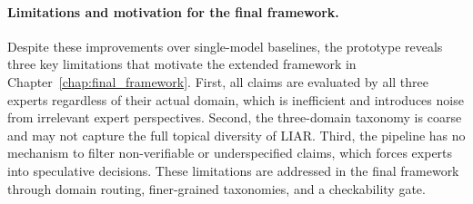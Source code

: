 \paragraph{Limitations and motivation for the final framework.}
Despite these improvements over single-model baselines, the prototype reveals three key limitations that motivate the extended framework in Chapter~\ref{chap:final_framework}. First, all claims are evaluated by all three experts regardless of their actual domain, which is inefficient and introduces noise from irrelevant expert perspectives. Second, the three-domain taxonomy is coarse and may not capture the full topical diversity of LIAR. Third, the pipeline has no mechanism to filter non-verifiable or underspecified claims, which forces experts into speculative decisions. These limitations are addressed in the final framework through domain routing, finer-grained taxonomies, and a checkability gate.